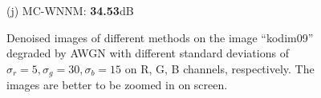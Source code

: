 \documentclass[10pt,onecolumn,letterpaper]{article}
\begin{document}
\begin{figure}[!htbp]
{\begin{minipage}[t]{0.24\textwidth}
{\footnotesize (j) MC-WNNM: \textbf{34.53}dB}
\end{minipage}
}
\caption{Denoised images of different methods on the image ``kodim09'' degraded by AWGN with different standard deviations of $\sigma_{r}=5, \sigma_{g}=30, \sigma_{b}=15$ on R, G, B channels, respectively. The images are better to be zoomed in on screen.}
\label{f5}
\end{figure}




\begin{figure}[!htbp]
\centering
{}
\end{figure}
\end{document}
